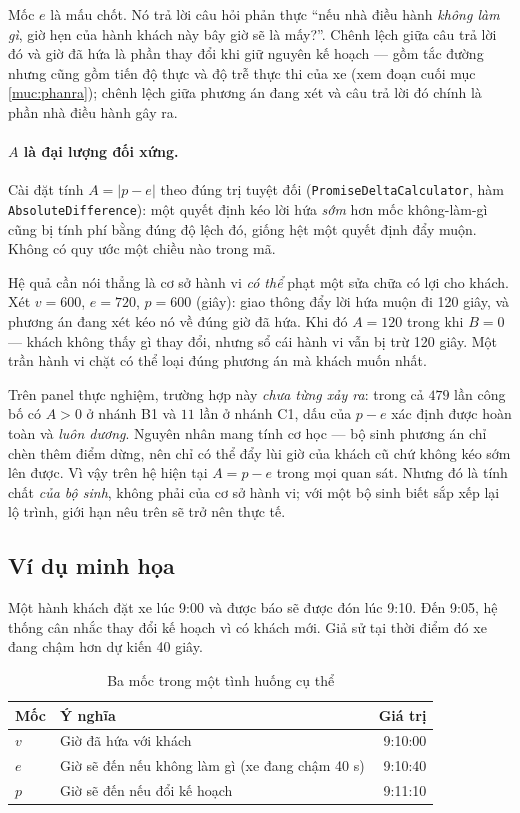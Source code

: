 Mốc $e$ là mấu chốt. Nó trả lời câu hỏi phản thực ``nếu nhà điều hành \emph{không làm gì}, giờ
hẹn của hành khách này bây giờ sẽ là mấy?''. Chênh lệch giữa câu trả lời đó và giờ đã hứa là
phần thay đổi khi giữ nguyên kế hoạch --- gồm tắc đường nhưng cũng gồm tiến độ thực và độ trễ thực
thi của xe (xem đoạn cuối mục \ref{muc:phanra}); chênh lệch giữa phương án đang xét và câu trả
lời đó chính là phần nhà điều hành gây ra.

\paragraph{$A$ là đại lượng đối xứng.} Cài đặt tính $A = |p - e|$ theo đúng trị tuyệt đối
(\texttt{PromiseDeltaCalculator}, hàm \texttt{AbsoluteDifference}): một quyết định kéo lời hứa
\emph{sớm} hơn mốc không-làm-gì cũng bị tính phí bằng đúng độ lệch đó, giống hệt một quyết định
đẩy muộn. Không có quy ước một chiều nào trong mã.

Hệ quả cần nói thẳng là cơ sở hành vi \emph{có thể} phạt một sửa chữa có lợi cho khách. Xét
$v = 600$, $e = 720$, $p = 600$ (giây): giao thông đẩy lời hứa muộn đi 120 giây, và phương án
đang xét kéo nó về đúng giờ đã hứa. Khi đó $A = 120$ trong khi $B = 0$ --- khách không thấy gì
thay đổi, nhưng sổ cái hành vi vẫn bị trừ 120 giây. Một trần hành vi chặt có thể loại đúng phương
án mà khách muốn nhất.

Trên panel thực nghiệm, trường hợp này \emph{chưa từng xảy ra}: trong cả $479$ lần công bố có
$A > 0$ ở nhánh B1 và $11$ lần ở nhánh C1, dấu của $p - e$ xác định được hoàn toàn và
\emph{luôn dương}. Nguyên nhân mang tính cơ học --- bộ sinh phương án chỉ chèn thêm điểm dừng,
nên chỉ có thể đẩy lùi giờ của khách cũ chứ không kéo sớm lên được. Vì vậy trên hệ hiện tại
$A = p - e$ trong mọi quan sát. Nhưng đó là tính chất \emph{của bộ sinh}, không phải của cơ sở
hành vi; với một bộ sinh biết sắp xếp lại lộ trình, giới hạn nêu trên sẽ trở nên thực tế.

\subsection{Ví dụ minh họa}

Một hành khách đặt xe lúc 9:00 và được báo sẽ được đón lúc 9:10. Đến 9:05, hệ thống cân nhắc
thay đổi kế hoạch vì có khách mới. Giả sử tại thời điểm đó xe đang chậm hơn dự kiến 40 giây.

\begin{table}[htbp]
\centering
\caption{Ba mốc trong một tình huống cụ thể}
\label{bang:bamoc}
\small
\begin{tabular}{@{}llr@{}}
\toprule
\textbf{Mốc} & \textbf{Ý nghĩa} & \textbf{Giá trị}\\
\midrule
$v$ & Giờ đã hứa với khách & 9:10:00\\
$e$ & Giờ sẽ đến nếu không làm gì (xe đang chậm 40 s) & 9:10:40\\
$p$ & Giờ sẽ đến nếu đổi kế hoạch & 9:11:10\\
\bottomrule
\end{tabular}
\end{table}

